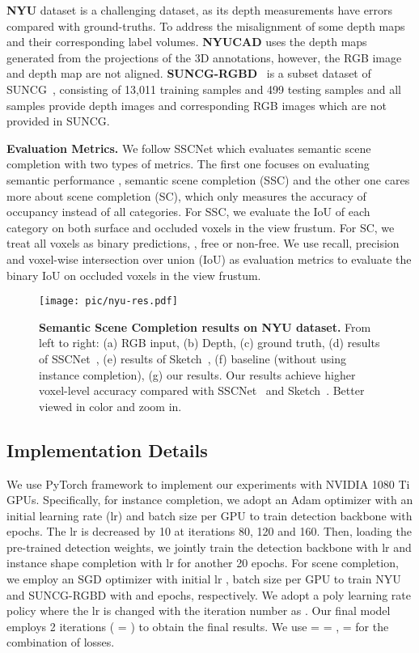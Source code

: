 \documentclass[final]{cvpr}
\begin{document}
\textbf{NYU} dataset is a challenging dataset, as its depth measurements have errors compared with ground-truths. To address the misalignment of some depth maps and their corresponding label volumes. \textbf{NYUCAD} uses the depth maps generated from the projections of the 3D annotations, however, the RGB image and depth map are not aligned. 
\textbf{SUNCG-RGBD}~\cite{liu2018see-satnet} is a subset dataset of SUNCG~\cite{song2017semantic-sscnet}, consisting of 13,011 training samples and 499 testing samples and all samples provide depth images and corresponding RGB images which are not provided in SUNCG.


\noindent \textbf{Evaluation Metrics.} We follow SSCNet \cite{song2017semantic-sscnet} which evaluates semantic scene completion with two types of metrics. The first one focuses on evaluating semantic performance , semantic scene completion (SSC) and the other one cares more about scene completion (SC), which only measures the accuracy of occupancy instead of all categories. For SSC, we evaluate the IoU of each category on both surface and occluded voxels in the view frustum. For SC, we treat all voxels as binary predictions, , free or non-free. We use recall, precision and voxel-wise intersection over union (IoU) as evaluation metrics to evaluate the binary IoU on occluded voxels in the view frustum.



\begin{figure*}[t!]
\centering
\texttt{[image: pic/nyu-res.pdf]}
\caption{\textbf{Semantic Scene Completion results on NYU dataset.} From left to right: (a) RGB input, (b) Depth, (c) ground truth, (d) results of SSCNet~\cite{song2017semantic-sscnet}, (e) results of Sketch~\cite{Chen_2020_SketchAwareSSC}, (f) baseline (without using instance completion), (g) our results. Our results achieve higher voxel-level accuracy compared with SSCNet~\cite{song2017semantic-sscnet} and Sketch~\cite{Chen_2020_SketchAwareSSC}. Better viewed in color and zoom in.}
\vspace{-0.5cm}
\label{fig:nyu-res}
\end{figure*}
\vspace{-0.2cm}
\subsection{Implementation Details}
\vspace{-0.2cm}
We use PyTorch framework to implement our experiments with  NVIDIA 1080 Ti GPUs. Specifically, for instance completion, we adopt an Adam optimizer with an initial learning rate (lr)  and  batch size per GPU to train detection backbone with  epochs. The lr is decreased by 10 at iterations 80, 120 and 160. Then, loading the pre-trained detection weights, we jointly train the detection backbone with  lr and instance shape completion with  lr for another 20 epochs. 
For scene completion, we employ an SGD optimizer with initial lr , batch size  per GPU to train NYU and SUNCG-RGBD with  and  epochs, respectively. We adopt a poly learning rate policy where the lr is changed with the iteration number  as . Our final model employs 2 iterations ( = ) to obtain the final results.
We use  =  = ,  =  for the combination of losses. \vspace{-0.2cm}
\end{document}
